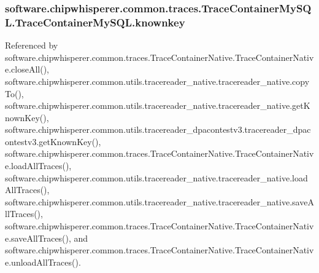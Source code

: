 \subsubsection[{knownkey}]{\setlength{\rightskip}{0pt plus 5cm}software.\+chipwhisperer.\+common.\+traces.\+Trace\+Container\+My\+S\+Q\+L.\+Trace\+Container\+My\+S\+Q\+L.\+knownkey}\label{classsoftware_1_1chipwhisperer_1_1common_1_1traces_1_1TraceContainerMySQL_1_1TraceContainerMySQL_aa0eeddac3722b946a789e2f20c0ccb44}


Referenced by software.\+chipwhisperer.\+common.\+traces.\+Trace\+Container\+Native.\+Trace\+Container\+Native.\+close\+All(), software.\+chipwhisperer.\+common.\+utils.\+tracereader\+\_\+native.\+tracereader\+\_\+native.\+copy\+To(), software.\+chipwhisperer.\+common.\+utils.\+tracereader\+\_\+native.\+tracereader\+\_\+native.\+get\+Known\+Key(), software.\+chipwhisperer.\+common.\+utils.\+tracereader\+\_\+dpacontestv3.\+tracereader\+\_\+dpacontestv3.\+get\+Known\+Key(), software.\+chipwhisperer.\+common.\+traces.\+Trace\+Container\+Native.\+Trace\+Container\+Native.\+load\+All\+Traces(), software.\+chipwhisperer.\+common.\+utils.\+tracereader\+\_\+native.\+tracereader\+\_\+native.\+load\+All\+Traces(), software.\+chipwhisperer.\+common.\+utils.\+tracereader\+\_\+native.\+tracereader\+\_\+native.\+save\+All\+Traces(), software.\+chipwhisperer.\+common.\+traces.\+Trace\+Container\+Native.\+Trace\+Container\+Native.\+save\+All\+Traces(), and software.\+chipwhisperer.\+common.\+traces.\+Trace\+Container\+Native.\+Trace\+Container\+Native.\+unload\+All\+Traces().

\hypertarget{classsoftware_1_1chipwhisperer_1_1common_1_1traces_1_1TraceContainerMySQL_1_1TraceContainerMySQL_a5ca5346100499b78744181e546e6cc40}{}
